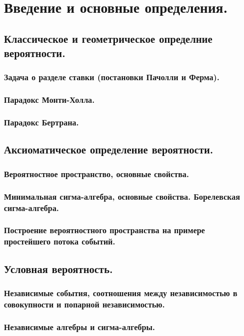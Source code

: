 \section{Введение и основные определения.}
\subsection{Классическое и геометрическое определние вероятности.}
\subsubsection{Задача о разделе ставки (постановки Пачолли и Ферма).}
\subsubsection{Парадокс Монти-Холла.}
\subsubsection{Парадокс Бертрана.}
\subsection{Аксиоматическое определение вероятности.}
\subsubsection{Вероятностное пространство, основные свойства.}
\subsubsection{Минимальная сигма-алгебра, основные свойства. Борелевская сигма-алгебра.}
\subsubsection{Построение вероятностного пространства на примере простейшего потока событий.}
\subsection{Условная вероятность.}
\subsubsection{Независимые события, соотношения между независимостью в совокупности и попарной независимостью.}
\subsubsection{Независимые алгебры и сигма-алгебры.}
